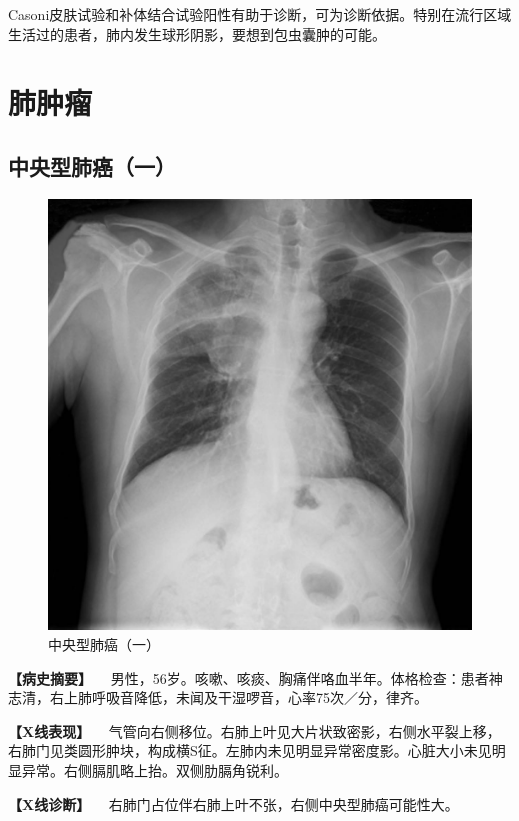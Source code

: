 Casoni皮肤试验和补体结合试验阳性有助于诊断，可为诊断依据。特别在流行区域生活过的患者，肺内发生球形阴影，要想到包虫囊肿的可能。

\section{肺肿瘤}

\subsection{中央型肺癌（一）}

\begin{figure}[!htbp]
 \centering
 \includegraphics{./images/Image00163.jpg}
 \captionsetup{justification=centering}
 \caption{中央型肺癌（一）}
 \label{fig3-8-1}
  \end{figure} 

\textbf{【病史摘要】}
　男性，56岁。咳嗽、咳痰、胸痛伴咯血半年。体格检查：患者神志清，右上肺呼吸音降低，未闻及干湿啰音，心率75次／分，律齐。

\textbf{【X线表现】}
　气管向右侧移位。右肺上叶见大片状致密影，右侧水平裂上移，右肺门见类圆形肿块，构成横S征。左肺内未见明显异常密度影。心脏大小未见明显异常。右侧膈肌略上抬。双侧肋膈角锐利。

\textbf{【X线诊断】}
　右肺门占位伴右肺上叶不张，右侧中央型肺癌可能性大。

